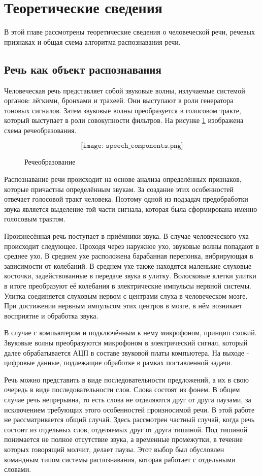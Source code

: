 \section{Теоретические сведения}
В этой главе рассмотрены теоретические сведения о человеческой речи, речевых признаках и общая схема алгоритма распознавания речи.

\subsection{Речь как объект распознавания}
Человеческая речь представляет собой звуковые волны, излучаемые системой органов: лёгкими, бронхами и трахеей. Они выступают в роли генератора тоновых сигналов. Затем звуковые волны преобразуется в голосовом тракте, который выступает в роли совокупности фильтров. На рисунке \ref{fig:speech_components} изображена схема речеобразования.

\begin{figure}[H]
	\[\texttt{[image: speech\_components.png]}\]
	\caption{Речеобразование}
	\label{fig:speech_components}
\end{figure}

Распознавание речи происходит на основе анализа определённых признаков, которые причастны определённым звукам. За создание этих особенностей отвечает голосовой тракт человека. Поэтому одной из подзадач предобработки звука является выделение той части сигнала, которая была сформирована именно голосовым трактом.

Произнесённая речь поступает в приёмники звука. В случае человеческого уха происходит следующее. Проходя через наружное ухо, звуковые волны попадают в среднее ухо. В среднем ухе расположена барабанная перепонка, вибрирующая в зависимости от колебаний. В среднем ухе также находятся маленькие слуховые косточки, задействованные в передаче звука в улитку. Волосковые клетки улитки в итоге преобразуют её колебания в электрические импульсы нервной системы. Улитка соединяется слуховым нервом с центрами слуха в человеческом мозге. При достижении нервным импульсом этих центров в мозге, в нём возникает восприятие и обработка звука. 

В случае с компьютером и подключённым к нему микрофоном, принцип схожий. Звуковые волны преобразуются микрофоном в электрический сигнал, который далее обрабатывается АЦП в составе звуковой платы компьютера. На выходе - цифровые данные, подлежащие обработке в рамках поставленной задачи.

Речь можно представить в виде последовательности предложений, а их в свою очередь в виде последовательности слов. Слова состоят из фонем. В общем случае речь непрерывна, то есть слова не отделяются друг от друга паузами, за исключением требующих этого особенностей произносимой речи. В этой работе не рассматривается общий случай. Здесь рассмотрен частный случай, когда речь состоит из отдельных слов, отделяемых друг от друга тишиной. Под тишиной понимается не полное отсутствие звука, а временные промежутки, в течение которых говорящий молчит, делает паузы. Этот выбор был обусловлен командным типом системы распознавания, которая работает с отдельными словами.

